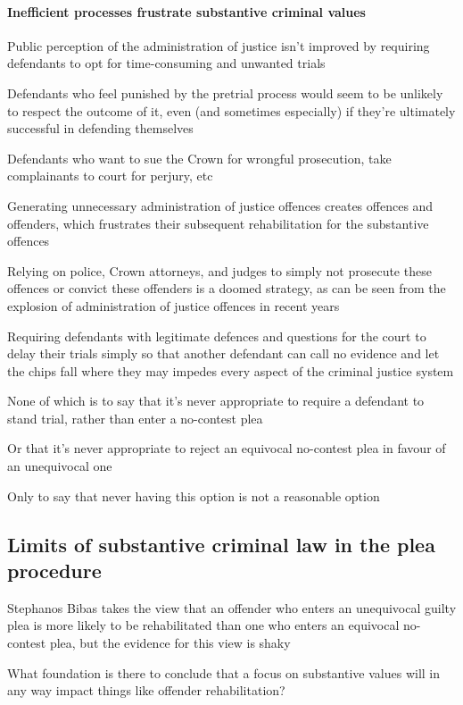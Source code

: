 \paragraph{Inefficient processes frustrate substantive criminal values}

Public perception of the administration of justice isn't improved by requiring defendants to opt for time-consuming and unwanted trials

Defendants who feel punished by the pretrial process would seem to be unlikely to respect the outcome of it, even (and sometimes especially) if they're ultimately successful in defending themselves

Defendants who want to sue the Crown for wrongful prosecution, take complainants to court for perjury, etc

Generating unnecessary administration of justice offences creates offences and offenders, which frustrates their subsequent rehabilitation for the substantive offences

Relying on police, Crown attorneys, and judges to simply not prosecute these offences or convict these offenders is a doomed strategy, as can be seen from the explosion of administration of justice offences in recent years

Requiring defendants with legitimate defences and questions for the court to delay their trials simply so that another defendant can call no evidence and let the chips fall where they may impedes every aspect of the criminal justice system

None of which is to say that it's never appropriate to require a defendant to stand trial, rather than enter a no-contest plea

Or that it's never appropriate to reject an equivocal no-contest plea in favour of an unequivocal one

Only to say that never having this option is not a reasonable option

\subsection{Limits of substantive criminal law in the plea procedure}

Stephanos Bibas takes the view that an offender who enters an unequivocal guilty plea is more likely to be rehabilitated than one who enters an equivocal no-contest plea, but the evidence for this view is shaky

What foundation is there to conclude that a focus on substantive values will in any way impact things like offender rehabilitation?

